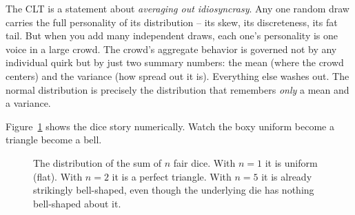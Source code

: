 \begin{intuitionbox}
The CLT is a statement about \emph{averaging out idiosyncrasy}. Any one random draw
carries the full personality of its distribution -- its skew, its discreteness, its
fat tail. But when you add many independent draws, each one's personality is one voice
in a large crowd. The crowd's aggregate behavior is governed not by any individual
quirk but by just two summary numbers: the mean (where the crowd centers) and the
variance (how spread out it is). Everything else washes out. The normal distribution
is precisely the distribution that remembers \emph{only} a mean and a variance.
\end{intuitionbox}

Figure~\ref{ch21:fig-dice} shows the dice story numerically. Watch the boxy uniform
become a triangle become a bell.

\begin{figure}[H]
\centering
{}
\caption{The distribution of the sum of $n$ fair dice. With $n=1$ it is uniform (flat).
With $n=2$ it is a perfect triangle. With $n=5$ it is already strikingly bell-shaped,
even though the underlying die has nothing bell-shaped about it.}
\label{ch21:fig-dice}
\end{figure}

